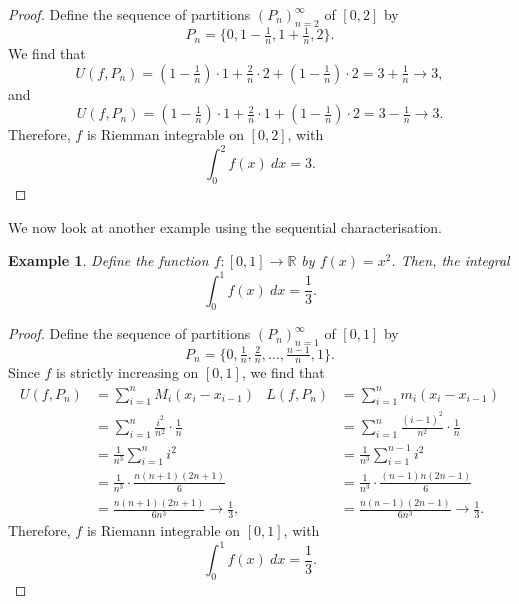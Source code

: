 \documentclass[a4paper, openany]{memoir}
\theoremstyle{definition}
\theoremstyle{plain}
\newtheorem{example}[definition]{Example}
\begin{document}
\begin{proof}
Define the sequence of partitions $(P_n)_{n=2}^{\infty}$ of $[0, 2]$ by
\[P_n = \{0, 1 - \tfrac{1}{n}, 1 + \tfrac{1}{n}, 2\}.\]
We find that
\[U(f, P_n) = (1 - \tfrac{1}{n}) \cdot 1 + \tfrac{2}{n} \cdot 2 + (1 - \tfrac{1}{n}) \cdot 2 = 3 + \tfrac{1}{n} \to 3,\]
and
\[U(f, P_n) = (1 - \tfrac{1}{n}) \cdot 1 + \tfrac{2}{n} \cdot 1 + (1 - \tfrac{1}{n}) \cdot 2 = 3 - \tfrac{1}{n} \to 3.\]
Therefore, $f$ is Riemman integrable on $[0, 2]$, with
\[\int_0^2 f(x) \ dx = 3.\]
\end{proof}
\noindent We now look at another example using the sequential characterisation.
\begin{example}
Define the function $f: [0, 1] \to \mathbb{R}$ by $f(x) = x^2$. Then, the integral
\[\int_0^1 f(x) \ dx = \frac{1}{3}.\]
\end{example}
\begin{proof}
Define the sequence of partitions $(P_n)_{n=1}^{\infty}$ of $[0, 1]$ by
\[P_n = \{0, \tfrac{1}{n}, \tfrac{2}{n}, \dots, \tfrac{n-1}{n}, 1\}.\]
Since $f$ is strictly increasing on $[0, 1]$, we find that
\begin{align*}
    U(f, P_n) &= \sum_{i=1}^n M_i (x_i - x_{i-1}) & L(f, P_n) &= \sum_{i=1}^n m_i (x_i - x_{i-1}) \\
    &= \sum_{i=1}^n \frac{i^2}{n^2} \cdot \frac{1}{n} & &= \sum_{i=1}^n \frac{(i-1)^2}{n^2} \cdot \frac{1}{n} \\
    &= \frac{1}{n^3} \sum_{i=1}^n i^2 & &= \frac{1}{n^3} \sum_{i=1}^{n-1} i^2 \\
    &= \frac{1}{n^3} \cdot \frac{n(n+1)(2n+1)}{6} & &= \frac{1}{n^3} \cdot \frac{(n-1)n(2n-1)}{6} \\
    &= \frac{n(n+1)(2n+1)}{6n^3} \to \frac{1}{3}, & &= \frac{n(n-1)(2n-1)}{6n^3} \to \frac{1}{3}.
\end{align*}
Therefore, $f$ is Riemann integrable on $[0, 1]$, with
\[\int_0^1 f(x) \ dx = \frac{1}{3}.\]
\end{proof}
\end{document}

